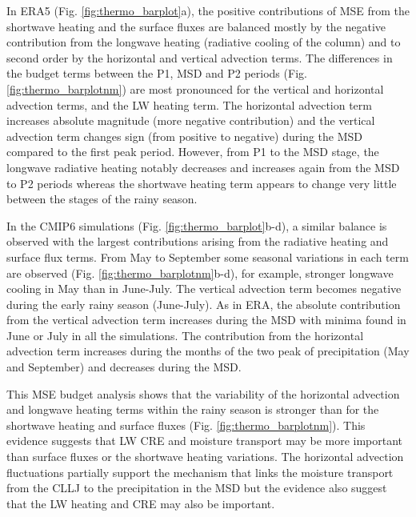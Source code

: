 In ERA5 (Fig. \ref{fig:thermo_barplot}a), the positive contributions of MSE from the shortwave heating and the surface fluxes are balanced mostly by the negative contribution from the longwave heating (radiative cooling of the column)  and to second order by the horizontal and vertical advection terms. 
The differences in the budget terms between the P1, MSD and P2 periods (Fig. \ref{fig:thermo_barplotnm}) are most pronounced for the vertical and horizontal advection terms, and the LW heating term. The horizontal advection term increases absolute magnitude (more negative contribution) and the vertical advection term changes sign (from positive to negative) during the MSD compared to the first peak period. However, from P1 to the MSD stage, the longwave radiative heating notably decreases and increases again from the MSD to P2 periods whereas the shortwave heating term appears to change very little between the stages of the rainy season.

In the CMIP6 simulations (Fig. \ref{fig:thermo_barplot}b-d), a similar balance is observed with the largest contributions arising from the radiative heating and surface flux terms. 
From May to September some seasonal variations in each term are observed (Fig. \ref{fig:thermo_barplotnm}b-d), for example, stronger longwave cooling in May than in June-July. The vertical advection term becomes negative during the early rainy season (June-July). As in ERA, the absolute contribution from the vertical advection term increases during the MSD with minima found in June or July in all the simulations. 
The contribution from the horizontal advection term increases during the months of the two peak of precipitation (May and September) and decreases during the MSD. 

This MSE budget analysis shows that the variability of the horizontal advection and longwave heating terms within the rainy season is stronger than for the shortwave heating and surface fluxes (Fig. \ref{fig:thermo_barplotnm}). 
This evidence suggests that LW CRE and moisture transport may be more important than surface fluxes or the shortwave heating variations. 
The horizontal advection fluctuations partially support the mechanism that links the moisture transport from the CLLJ to the precipitation in the MSD but the evidence also suggest that the LW heating and CRE may also be important. 

